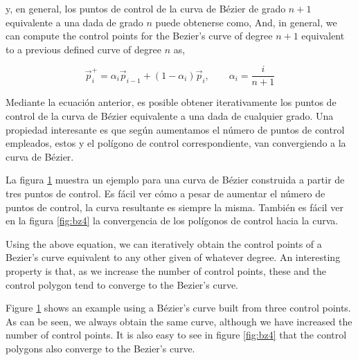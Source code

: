 \begin{paracol}{2}
y, en general, los puntos de control de la curva de Bézier de grado $n+1$ equivalente  a una dada de grado $n$ puede obtenerse como,
\switchcolumn
And, in general, we can compute the control points for the Bezier's curve of degree $n+1$ equivalent to a previous defined curve of degree $n$ as,
\end{paracol}
\begin{equation*}
\vec{p}_i^+ = \alpha_i\vec{p}_{i-1} + (1-\alpha_i)\vec{p}_i, \qquad \alpha_i =\frac{i}{n+1}
\end{equation*}
\begin{paracol}{2}
Mediante la ecuación anterior, es posible obtener iterativamente los puntos de control de la curva de Bézier equivalente a una dada de cualquier grado. Una propiedad interesante es que según aumentamos el número de puntos de control empleados, estos y el polígono de control correspondiente, van convergiendo a la curva de Bézier. 

La figura \ref{fig:bzgrad} muestra un ejemplo para una curva de Bézier construida a partir de tres puntos de control. Es fácil ver cómo a pesar de aumentar el número de puntos de control, la curva resultante es siempre la misma.  También es fácil ver en la figura \ref{fig:bz4} la convergencia de los polígonos de control hacia la curva.

\switchcolumn
Using the above equation, we can iteratively obtain the control points of a Bezier's curve equivalent to any other given of whatever degree. An interesting property is that, as we increase the number of control points, these and the control polygon tend to converge to the Bezier's curve.

Figure \ref{fig:bzgrad} shows an example using a Bézier's curve built from three control points. As can be seen, we always obtain the same curve, although we have increased the number of control points. It is also easy to see in figure \ref{fig:bz4} that the control polygons also converge to the Bezier's curve. 
\end{paracol}
\begin{figure}[h]
\centering
{} \qquad 
{}\\
 \qquad 
{}
\label{fig:bzgrad}
\end{figure}
